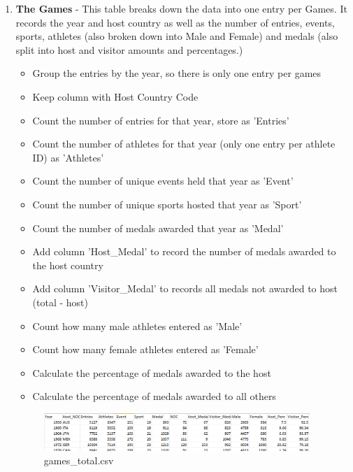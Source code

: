 \documentclass[a4 paper, 12pt]{article}
\begin{document}
\begin{enumerate}
            \item \textbf{The Games} - This table breaks down the data into one entry per Games. It records the year and host country as well as the number of entries, events, sports, athletes (also broken down into Male and Female) and medals (also split into host and visitor amounts and percentages.)
                \begin{itemize}
                    \item Group the entries by the year, so there is only one entry per games
                    \item Keep column with Host Country Code
                    \item Count the number of entries for that year, store as 'Entries'
                    \item Count the number of athletes for that year (only one entry per athlete ID) as 'Athletes'
                    \item Count the number of unique events held that year as 'Event'
                    \item Count the number of unique sports hosted that year as 'Sport'
                    \item Count the number of medals awarded that year as 'Medal'
                    \item Add column 'Host\_Medal' to record the number of medals awarded to the host country
                    \item Add column 'Visitor\_Medal' to records all medals not awarded to host (total - host)
                    \item Count how many male athletes entered as 'Male'
                    \item Count how many female athletes entered as 'Female'
                    \item Calculate the percentage of medals awarded to the host
                    \item Calculate the percentage of medals awarded to all others
                \end{itemize}
                \begin{figure} [H]
                    \centering
                    \includegraphics[width=0.95\textwidth, frame]
                        {./images/data/games_total.png}      
                        \caption{games\_total.csv} 
                \end{figure}


\end{enumerate}
\end{document}
